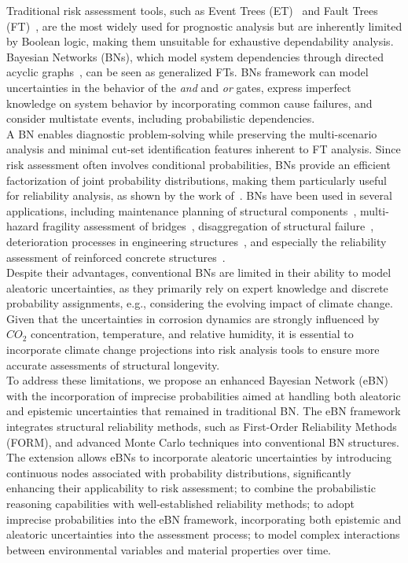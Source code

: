 Traditional risk assessment tools, such as Event Trees (ET)~\cite{papazoglou_mathematical_1998} and Fault Trees (FT)~\cite{kabir_overview_2017}, are the most widely used for prognostic analysis but are inherently limited by Boolean logic, making them unsuitable for exhaustive dependability analysis.
Bayesian Networks (BNs), which model system dependencies through directed acyclic graphs~\cite{mahadevan2001bayesian}, can be seen as generalized FTs.
BNs framework can model uncertainties in the behavior of the \textit{and} and \textit{or} gates, express imperfect knowledge on system behavior by incorporating common cause failures, and consider multistate events, including probabilistic dependencies. \\
A BN enables diagnostic problem-solving while preserving the multi-scenario analysis and minimal cut-set identification features inherent to FT analysis.
Since risk assessment often involves conditional probabilities, BNs provide an efficient factorization of joint probability distributions, making them particularly useful for reliability analysis, as shown by the work of~\textcite{langseth_bayesian_2007}.
BNs have been used in several applications, including maintenance planning of structural components~\cite{morato2022optimal}, multi-hazard fragility assessment of bridges~\cite{gehl2016development, barros2024gaussian}, disaggregation of structural failure~\cite{yazdani2020bayesian}, deterioration processes in engineering structures~\cite{luque2019risk,lee2023dynamic,tran2020dynamic}, and especially the reliability assessment of reinforced concrete structures~\cite{hackl2016reliability,hosseini2024dynamic,guo2024mixed}.\\
Despite their advantages, conventional BNs are limited in their ability to model aleatoric uncertainties, as they primarily rely on expert knowledge and discrete probability assignments, e.g., considering the evolving impact of climate change. Given that the uncertainties in corrosion dynamics are strongly influenced by $CO_2$ concentration, temperature, and relative humidity, it is essential to incorporate climate change projections into risk analysis tools to ensure more accurate assessments of structural longevity.\\
To address these limitations, we propose an enhanced Bayesian Network (eBN) with the incorporation of imprecise probabilities aimed at handling both aleatoric and epistemic uncertainties that remained in traditional BN.
The eBN framework integrates structural reliability methods, such as First-Order Reliability Methods (FORM), and advanced Monte Carlo techniques into conventional BN structures. The extension allows eBNs to incorporate aleatoric uncertainties by introducing continuous nodes associated with probability distributions, significantly enhancing their applicability to risk assessment; to combine the probabilistic reasoning capabilities with well-established reliability methods; to adopt imprecise probabilities into the eBN framework, incorporating both epistemic and aleatoric uncertainties into the assessment process; to model complex interactions between environmental variables and material properties over time.
